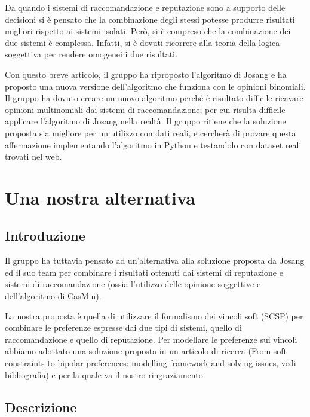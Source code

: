 \documentclass{report}
\begin{document}
	Da quando i sistemi di raccomandazione e reputazione sono a supporto
	delle decisioni si è pensato che la combinazione degli stessi potesse
	produrre risultati migliori rispetto ai sistemi isolati. Però, si è
	compreso che la combinazione dei due sistemi è complessa. Infatti, si è dovuti
	ricorrere alla teoria della logica soggettiva per rendere omogenei i due
	risultati. 
	
	Con questo breve articolo, il gruppo ha riproposto
	l'algoritmo di Josang e ha proposto una nuova versione dell'algoritmo
	che funziona con le opinioni binomiali. Il gruppo ha dovuto creare un
	nuovo algoritmo perché è risultato difficile ricavare opinioni
	multinomiali dai sistemi di raccomandazione; per cui risulta difficile
	applicare l'algoritmo di Josang nella realtà. Il gruppo ritiene che la
	soluzione proposta sia migliore per un utilizzo con dati reali, e
	cercherà di provare questa affermazione implementando l'algoritmo in
	Python e testandolo con dataset reali trovati nel web.
	\newpage
	\hypertarget{header-n226}{%
		\section{Una nostra alternativa}\label{header-n226}}
	
	\hypertarget{header-n227}{%
		\subsection{Introduzione}\label{header-n227}}
	
	Il gruppo ha tuttavia pensato ad un'alternativa alla soluzione proposta da Josang ed il suo team per combinare i risultati ottenuti dai sistemi di reputazione e sistemi di raccomandazione (ossia l'utilizzo delle opinione soggettive e dell'algoritmo di CasMin).

    La nostra proposta è quella di utilizzare il formalismo dei vincoli soft (SCSP) per combinare le preferenze espresse dai due tipi di sistemi, quello di raccomandazione e quello di reputazione. Per modellare le preferenze sui vincoli abbiamo adottato una soluzione proposta in un articolo di ricerca (From soft constraints to bipolar preferences: modelling framework and solving issues, vedi bibliografia) e per la quale va il nostro ringraziamento.

	
	\hypertarget{header-n230}{%
		\subsection{Descrizione}\label{header-n230}}
	
\end{document}
